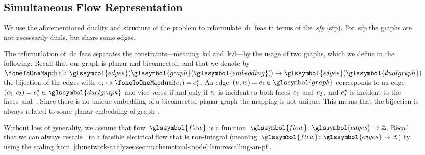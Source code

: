 \subsection{Simultaneous Flow Representation}
\label{ch:network-analyzes:simultaneous-flow-representation}
% 
We use the aforementioned duality and structure of the problem to
reformulate~\gls{dc}~\gls{feas} in terms of the~\emph{\acrlong{sfp}}
(\gls{sfp}). For~\gls{sfp} the graphs are not necessarily duals, but share some
edges.
% 
\begingroup
    
    \label{ch:networkAnalysis:problems:SimultaneousFlowProblem-Decision_Problem}
\endgroup
%
The reformulation of~\gls{dc}~\gls{feas} separates the
constraints---meaning~\gls{kcl} and~\gls{kvl}---by the usage of two graphs,
which we define in the following. Recall that our graph is planar and
biconnected, and that we denote by~$\oneToOneMap\colon \glssymbol{edges}
(\glssymbol{graph}(\glssymbol{embedding}))\to \glssymbol{edges}(
\glssymbol{dualgraph})$ the bijection of the edges
with~$\edge_i\mapsto\oneToOneMap(\edge_i) = \edge_i^\star$. An
edge~$(\vertexa,\vertexc) = \edge_i \in\glssymbol{graph}$ corresponds to an edge
$(\cycle_1,\cycle_2)=\edge_i^\star\in\glssymbol{dualgraph}$ and vice versa if
and only if $e_i$ is incident to both faces~$c_1$ and~$c_2$, and
$e_i^\star$ is incident to the faces~\vertexa and~\vertexc. Since there is
no unique embedding of a biconnected planar graph the mapping is not unique.
This means that the bijection is always related to some planar embedding of
graph~.

Without loss of generality, we assume that flow~$\glssymbol{flow}$ is a
function~$\glssymbol{flow}\colon\glssymbol{edges}\to\integers$. Recall that we
can always rescale~ to a feasible electrical flow that is
non-integral (meaning~$\glssymbol{flow}\colon\glssymbol{edges}\to\reals$) by
using the scaling
from~\cref{ch:network-analyzes:sec:mathematical-model:lem:rescalling-an-pf}.

